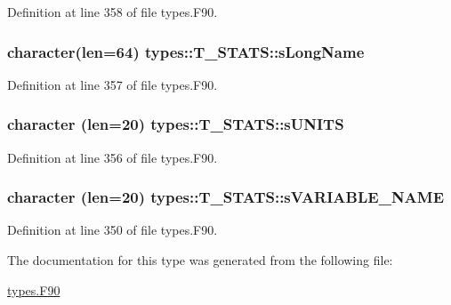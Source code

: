 Definition at line 358 of file types.F90.

\hypertarget{typetypes_1_1_t___s_t_a_t_s_aa86d81f56dab644208173e846616085e}{
\subsubsection[{sLongName}]{\setlength{\rightskip}{0pt plus 5cm}character(len=64) {\bf types::T\_\-STATS::sLongName}}}
\label{typetypes_1_1_t___s_t_a_t_s_aa86d81f56dab644208173e846616085e}


Definition at line 357 of file types.F90.

\hypertarget{typetypes_1_1_t___s_t_a_t_s_a9d260f63bbbb23de5e7e250e31a670c3}{
\subsubsection[{sUNITS}]{\setlength{\rightskip}{0pt plus 5cm}character (len=20) {\bf types::T\_\-STATS::sUNITS}}}
\label{typetypes_1_1_t___s_t_a_t_s_a9d260f63bbbb23de5e7e250e31a670c3}


Definition at line 356 of file types.F90.

\hypertarget{typetypes_1_1_t___s_t_a_t_s_ab81130a44a581fc3b22fea055a9be90d}{
\subsubsection[{sVARIABLE\_\-NAME}]{\setlength{\rightskip}{0pt plus 5cm}character (len=20) {\bf types::T\_\-STATS::sVARIABLE\_\-NAME}}}
\label{typetypes_1_1_t___s_t_a_t_s_ab81130a44a581fc3b22fea055a9be90d}


Definition at line 350 of file types.F90.



The documentation for this type was generated from the following file:\begin{DoxyCompactItemize}
\item 
\hyperlink{types_8_f90}{types.F90}\end{DoxyCompactItemize}
